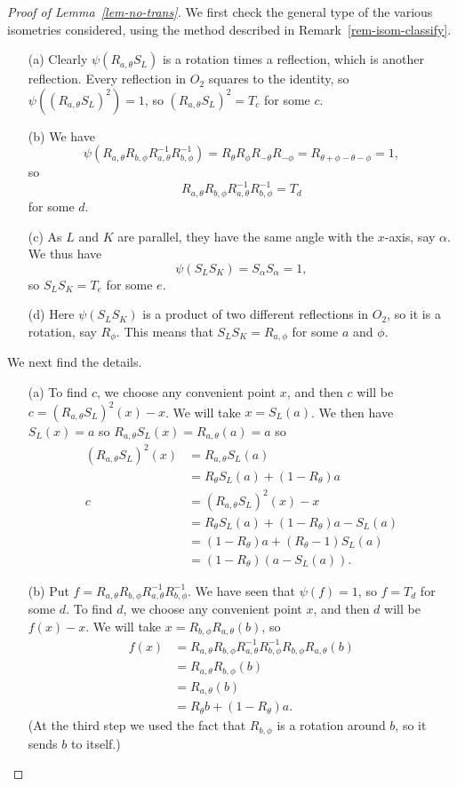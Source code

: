 \documentclass{amsart}
\newcommand{\al}        {\alpha}
\newcommand{\tht}       {\theta}
\renewcommand{\:}{\colon}
\theoremstyle{definition}
\begin{document}
\begin{proof}[Proof of Lemma~\ref{lem-no-trans}]
 We first check the general type of the various isometries considered,
 using the method described in Remark~\ref{rem-isom-classify}.
 \begin{itemize}
  \item[(a)] Clearly $\psi(R_{a,\tht}S_L)$ is a rotation times a
   reflection, which is another reflection.  Every reflection in $O_2$
   squares to the identity, so $\psi((R_{a,\tht}S_L)^2)=1$, so
   $(R_{a,\tht}S_L)^2=T_c$ for some $c$.
  \item[(b)] We have
   \[ \psi(R_{a,\theta}R_{b,\phi}R_{a,\theta}^{-1}R_{b,\phi}^{-1}) = 
       R_\tht R_\phi R_{-\tht} R_{-\phi} = 
       R_{\tht+\phi-\tht-\phi} = 1,
   \]
   so 
   \[ R_{a,\theta}R_{b,\phi}R_{a,\theta}^{-1}R_{b,\phi}^{-1}= T_d \]
   for some $d$.
  \item[(c)] As $L$ and $K$ are parallel, they have the same angle
   with the $x$-axis, say $\al$.  We thus have 
   \[ \psi(S_LS_K) = S_\al S_\al = 1, \]
   so $S_LS_K=T_e$ for some $e$.
  \item[(d)] Here $\psi(S_LS_K)$ is a product of two different
   reflections in $O_2$, so it is a rotation, say $R_\phi$.  This
   means that $S_LS_K=R_{a,\phi}$ for some $a$ and $\phi$.
 \end{itemize}

 We next find the details.
 \begin{itemize}
  \item[(a)] To find $c$, we choose any convenient point $x$, and then
   $c$ will be $c=(R_{a,\theta}S_L)^2(x)-x$.  We will take $x=S_L(a)$.
   We then have $S_L(x)=a$ so $R_{a,\theta}S_L(x)=R_{a,\theta}(a)=a$ so
   \begin{align*}
    (R_{a,\theta}S_L)^2(x)
      &= R_{a,\theta}S_L(a) \\
      &= R_\tht S_L(a) + (1-R_\tht)a \\
    c &= (R_{a,\theta}S_L)^2(x) - x \\
      &= R_\tht S_L(a) + (1-R_\tht)a - S_L(a) \\
      &= (1-R_\tht)a + (R_\tht-1)S_L(a) \\
      &= (1-R_\tht)(a-S_L(a)).
   \end{align*}
  \item[(b)] Put
   $f=R_{a,\theta}R_{b,\phi}R_{a,\theta}^{-1}R_{b,\phi}^{-1}$.  We
   have seen that $\psi(f)=1$, so $f=T_d$ for some $d$.  To find $d$,
   we choose any convenient point $x$, and then $d$ will be $f(x)-x$.
   We will take $x=R_{b,\phi}R_{a,\tht}(b)$, so 
   \begin{align*}
    f(x) &= R_{a,\theta}R_{b,\phi}R_{a,\theta}^{-1}R_{b,\phi}^{-1}
            R_{b,\phi}R_{a,\tht}(b) \\
         &= R_{a,\tht} R_{b,\phi}(b) \\
         &= R_{a,\tht}(b) \\
         &= R_\tht b + (1-R_\tht)a.
   \end{align*}
   (At the third step we used the fact that $R_{b,\phi}$ is a rotation
   around $b$, so it sends $b$ to itself.)


\end{itemize}
\end{proof}
\end{document}
